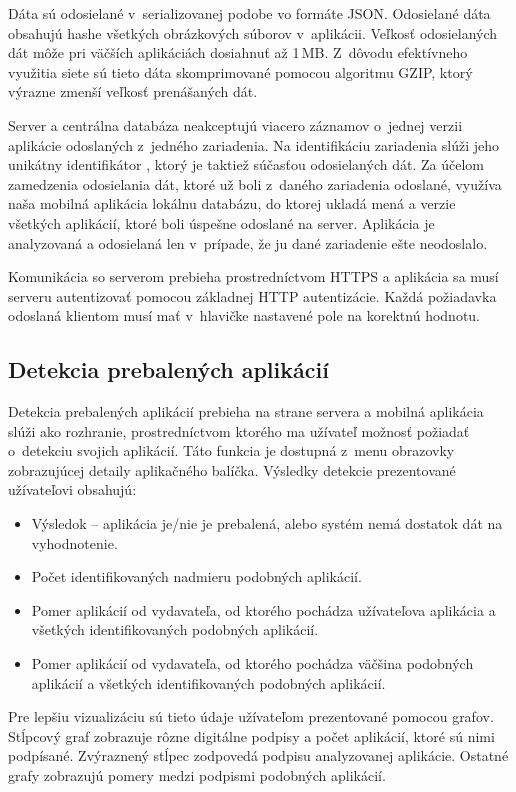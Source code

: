 Dáta sú odosielané v~serializovanej podobe vo formáte JSON. Odosielané dáta obsahujú hashe všetkých obrázkových súborov v~aplikácii. Veľkosť odosielaných dát môže pri väčších aplikáciách dosiahnuť až 1\,MB. Z~dôvodu efektívneho využitia siete sú tieto dáta skomprimované pomocou algoritmu GZIP, ktorý výrazne zmenší veľkosť prenášaných dát.

Server a centrálna databáza neakceptujú viacero záznamov o~jednej verzii aplikácie odoslaných z~jedného zariadenia. Na identifikáciu zariadenia slúži jeho unikátny identifikátor , ktorý je taktiež súčasťou odosielaných dát. Za účelom zamedzenia odosielania dát, ktoré už boli z~daného zariadenia odoslané, využíva naša mobilná aplikácia lokálnu databázu, do ktorej ukladá mená a verzie všetkých aplikácií, ktoré boli úspešne odoslané na server. Aplikácia je analyzovaná a odosielaná len v~prípade, že ju dané zariadenie ešte neodoslalo.

Komunikácia so serverom prebieha prostredníctvom HTTPS a aplikácia sa musí serveru autentizovať pomocou základnej HTTP autentizácie. Každá požiadavka odoslaná klientom musí mať v~hlavičke nastavené pole  na korektnú hodnotu.

\subsection{Detekcia prebalených aplikácií}
Detekcia prebalených aplikácií prebieha na strane servera a mobilná aplikácia slúži ako rozhranie, prostredníctvom ktorého ma užívateľ možnosť požiadať o~detekciu svojich aplikácií. Táto funkcia je dostupná z~menu obrazovky zobrazujúcej detaily aplikačného balíčka. Výsledky detekcie prezentované užívateľovi obsahujú:
\begin{itemize}
	\item Výsledok -- aplikácia je/nie je prebalená, alebo systém nemá dostatok dát na vyhodnotenie.
	\item Počet identifikovaných nadmieru podobných aplikácií.
	\item Pomer aplikácií od vydavateľa, od ktorého pochádza užívateľova aplikácia a všetkých identifikovaných podobných aplikácií.
	\item Pomer aplikácií od vydavateľa, od ktorého pochádza väčšina podobných aplikácií a všetkých identifikovaných podobných aplikácií.
\end{itemize}

Pre lepšiu vizualizáciu sú tieto údaje užívateľom prezentované pomocou grafov. Stĺpcový graf zobrazuje rôzne digitálne podpisy a počet aplikácií, ktoré sú nimi podpísané. Zvýraznený stĺpec zodpovedá podpisu analyzovanej aplikácie. Ostatné grafy zobrazujú pomery medzi podpismi podobných aplikácií.

